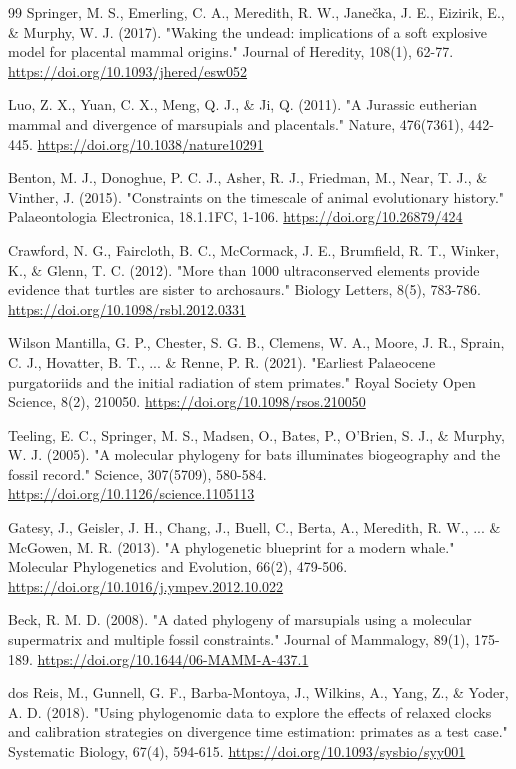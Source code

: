 \documentclass[10pt,letterpaper]{article}
\begin{document}
\begin{thebibliography}{99}
 Springer, M. S., Emerling, C. A., Meredith, R. W., Janečka, J. E., Eizirik, E., \& Murphy, W. J. (2017). "Waking the undead: implications of a soft explosive model for placental mammal origins." Journal of Heredity, 108(1), 62-77. \url{https://doi.org/10.1093/jhered/esw052}

 Luo, Z. X., Yuan, C. X., Meng, Q. J., \& Ji, Q. (2011). "A Jurassic eutherian mammal and divergence of marsupials and placentals." Nature, 476(7361), 442-445. \url{https://doi.org/10.1038/nature10291}

 Benton, M. J., Donoghue, P. C. J., Asher, R. J., Friedman, M., Near, T. J., \& Vinther, J. (2015). "Constraints on the timescale of animal evolutionary history." Palaeontologia Electronica, 18.1.1FC, 1-106. \url{https://doi.org/10.26879/424}

 Crawford, N. G., Faircloth, B. C., McCormack, J. E., Brumfield, R. T., Winker, K., \& Glenn, T. C. (2012). "More than 1000 ultraconserved elements provide evidence that turtles are sister to archosaurs." Biology Letters, 8(5), 783-786. \url{https://doi.org/10.1098/rsbl.2012.0331}

 Wilson Mantilla, G. P., Chester, S. G. B., Clemens, W. A., Moore, J. R., Sprain, C. J., Hovatter, B. T., ... \& Renne, P. R. (2021). "Earliest Palaeocene purgatoriids and the initial radiation of stem primates." Royal Society Open Science, 8(2), 210050. \url{https://doi.org/10.1098/rsos.210050}

 Teeling, E. C., Springer, M. S., Madsen, O., Bates, P., O'Brien, S. J., \& Murphy, W. J. (2005). "A molecular phylogeny for bats illuminates biogeography and the fossil record." Science, 307(5709), 580-584. \url{https://doi.org/10.1126/science.1105113}

 Gatesy, J., Geisler, J. H., Chang, J., Buell, C., Berta, A., Meredith, R. W., ... \& McGowen, M. R. (2013). "A phylogenetic blueprint for a modern whale." Molecular Phylogenetics and Evolution, 66(2), 479-506. \url{https://doi.org/10.1016/j.ympev.2012.10.022}

 Beck, R. M. D. (2008). "A dated phylogeny of marsupials using a molecular supermatrix and multiple fossil constraints." Journal of Mammalogy, 89(1), 175-189. \url{https://doi.org/10.1644/06-MAMM-A-437.1}

 dos Reis, M., Gunnell, G. F., Barba-Montoya, J., Wilkins, A., Yang, Z., \& Yoder, A. D. (2018). "Using phylogenomic data to explore the effects of relaxed clocks and calibration strategies on divergence time estimation: primates as a test case." Systematic Biology, 67(4), 594-615. \url{https://doi.org/10.1093/sysbio/syy001}


\end{thebibliography}
\end{document}
